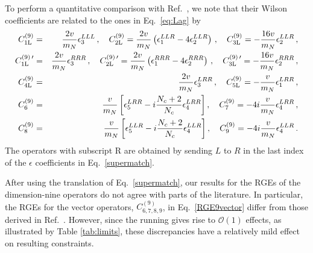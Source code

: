 \documentclass[letterpaper,11pt]{article}
\newcommand{\Or}{\mathcal O}
\newcommand{\nn}{\nonumber}
\begin{document}
To perform a quantitative comparison with Ref.\ \cite{Pas:2000vn}, we note that their Wilson coefficients are related to the ones in Eq.\ \eqref{eq:Lag} by
\begin{eqnarray}
C^{(9)}_{\rm 1L} &=& \frac{2 v}{m_N} \epsilon^{LLL}_3\,, \quad  C^{(9)}_{\rm 2L} = \frac{2 v}{m_N} \left( \epsilon^{LLR}_1 - 4\epsilon^{LLR}_2 \right)\,, \quad
C^{(9)}_{\rm 3L} =- \frac{16 v}{m_N}  \epsilon^{LLR}_2\,, \nn \\ 
C^{(9)\,\prime}_{\rm 1L} &=& \frac{2 v}{m_N} \epsilon^{RRR}_3\,, \quad  C^{(9)\, \prime}_{\rm 2L} = \frac{2 v}{m_N} \left( \epsilon^{RRR}_1 - 4 \epsilon^{RRR}_2 \right)\,, \quad
C^{(9)\,\prime}_{\rm 3L} =- \frac{16 v}{m_N}  \epsilon^{RRR}_2\,, \nn \\ 
C^{(9)}_{\rm 4L} &=& \frac{2 v}{m_N} \epsilon_3^{LRR}\,, \quad C^{(9)}_{\rm 5L} = -\frac{v}{m_N} \epsilon_1^{LRR}\,,\nn\\
C_6^{(9)} &=& \frac{v}{m_N} \left[\epsilon_5^{LRR}-i\frac{N_c+2}{N_c}\epsilon_4^{LRR}\right],\quad C_7^{(9)} = -4i\frac{v}{m_N} \epsilon_4^{LRR}\,,\nn\\
C_8^{(9)} &=& \frac{v}{m_N} \left[\epsilon_5^{LLR}-i\frac{N_c+2}{N_c}\epsilon_4^{LLR}\right],\quad C_9^{(9)} = -4i\frac{v}{m_N} \epsilon_4^{LLR}\,.
\label{supermatch}
\end{eqnarray}
The operators with subscript R are obtained by sending $L$ to $R$ in the last index of the $\epsilon$ coefficients in Eq.\ \eqref{supermatch}.

After using the translation of  Eq.\ \eqref{supermatch}, our results for the RGEs of the dimension-nine operators do not agree with parts of the literature. In particular, the RGEs for the vector operators, $C_{6,7,8,9}^{(9)}$, in Eq.\ \eqref{RGE9vector} differ from those derived in Ref.~\cite{Gonzalez:2015ady}. 
However, since the running gives rise to $\Or(1)$ effects, as illustrated by Table \ref{tab:limits}, these discrepancies have a relatively mild effect on resulting constraints. 
\end{document}
